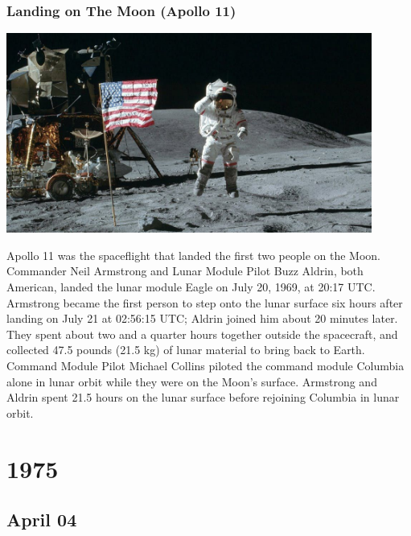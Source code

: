 \documentclass[11pt]{report}
\begin{document}
\subsection{Landing on The Moon (Apollo 11)}
\vspace{2mm}\begin{center}\includegraphics[width=12cm]{./img/apollo11.jpg}\end{center}
Apollo 11 was the spaceflight that landed the first two people on the Moon. Commander Neil Armstrong and Lunar Module Pilot Buzz Aldrin, both American, landed the lunar module Eagle on July 20, 1969, at 20:17 UTC. Armstrong became the first person to step onto the lunar surface six hours after landing on July 21 at 02:56:15 UTC; Aldrin joined him about 20 minutes later. They spent about two and a quarter hours together outside the spacecraft, and collected 47.5 pounds (21.5 kg) of lunar material to bring back to Earth. Command Module Pilot Michael Collins piloted the command module Columbia alone in lunar orbit while they were on the Moon's surface. Armstrong and Aldrin spent 21.5 hours on the lunar surface before rejoining Columbia in lunar orbit.

\chapter{1975}
\section{April 04}
\end{document}
